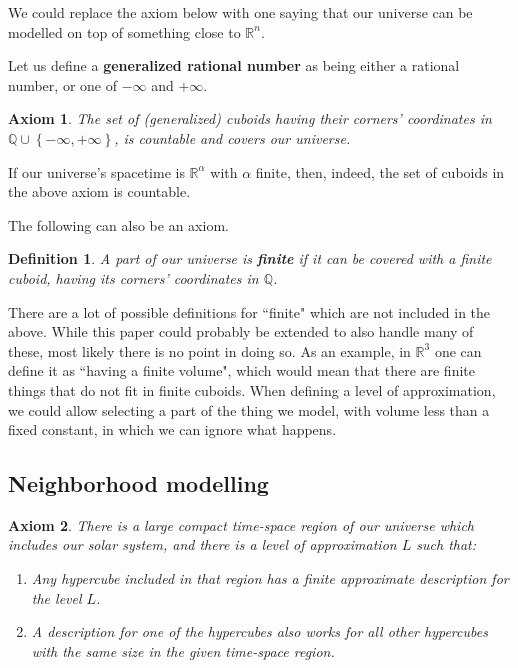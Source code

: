 \documentclass[a4paper
,draft
]{article}
\newcommand{\svn}[2][]{\todo[author=Virgil,color=red!25!white,#1]{#2}}
\def\reale{\mathbb{R}}
\def\rationale{\mathbb{Q}}
\newcommand{\multime}[1]{\left\{ #1 \right\}}
\newcommand{\definitie}[1]{\textbf{#1}}
\newcommand{\ghilimele}[1]{``#1"}
\newtheorem{definition}{Definition}
\newtheorem{axiom}{Axiom}
\begin{document}
We could replace the axiom below with one saying that our universe can be
modelled on top of something close to $\reale^n$.

Let us define a \definitie{generalized rational number} as being either a
rational number, or one of $-\infty$ and $+\infty$.

\begin{axiom}\label{ax:rationalcovering}
  The set of (generalized) cuboids having their corners' coordinates in
  $\rationale\cup\multime{-\infty, +\infty}$,
  is countable and covers our universe.
\end{axiom}

If our universe's spacetime is $\reale^\alpha$ with
$\alpha$ finite, then, indeed,
the set of cuboids in the above axiom is countable.

The following can also be an axiom.

\begin{definition}\label{finitecuboid}
  A part of our universe is \definitie{finite} if
  it can be covered with a finite cuboid,
  having its corners' coordinates in $\rationale$.
\end{definition}

There are a lot of possible definitions for \ghilimele{finite} which are not
included in the above.
While this paper could probably be extended to also handle many of these,
most likely there is no point in doing so.
As an example, in $\reale^3$ one can define it as
\ghilimele{having a finite volume}, which would
mean that there are finite things that do not fit in finite cuboids.
When defining a level of approximation, we could allow
selecting a part of the thing we model, with volume less than a fixed
constant, in which we can ignore what happens.

\subsection{Neighborhood modelling}

\svn{Move before the previous section.}
\begin{axiom}\label{ax:finiteneighborhood}
  There is a large compact time-space region of our universe which
  includes our solar
  system, and there is a level of approximation $L$ such that:
  \begin{enumerate}
    \item Any hypercube included in that region has a finite approximate
          description for the level $L$.
    \item A description for one of the hypercubes also works for all other
          hypercubes with the same size in the given time-space region.
  \end{enumerate}
\end{axiom}
\end{document}
